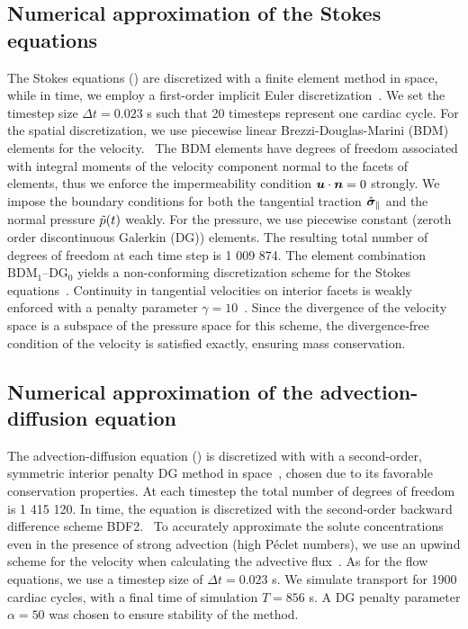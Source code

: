 \documentclass{WileyMSP-template}
\begin{document}
\subsection{Numerical approximation of the Stokes equations}
The Stokes equations () are discretized with a finite element method
in space, while in time, we employ a first-order implicit Euler discretization~\cite{butcher2016numerical}.
We set the timestep size $\Delta t = 0.023$ s such that 20 timesteps represent one cardiac cycle.
For the spatial discretization, we use piecewise linear Brezzi-Douglas-Marini (BDM)
elements for the velocity.~\cite{Brezzi1985TwoProblems, Nedelec1986AIR3}
The BDM elements have degrees of freedom associated with integral moments of the
velocity component normal to the facets of elements,
thus we enforce the impermeability condition $\bm{u}\cdot\bm{n}=0$ strongly.
We impose the boundary conditions for both the tangential traction $\hat{\bm{\sigma}}_{\parallel}$ and
the normal pressure $\Tilde{p}(t)$ weakly.
For the pressure, we use piecewise constant (zeroth order discontinuous Galerkin (DG)) elements.
The resulting total number of degrees of freedom at each time step is 1 009 874.
The element combination $\mathrm{BDM}_1$--$\mathrm{DG}_{0}$ yields a non-conforming
discretization scheme for the Stokes equations~\cite{Stenberg1989SomeEquations}.
Continuity in tangential velocities on interior facets
is weakly enforced with a penalty parameter $\gamma=10$~\cite{Hong2016AEquations}.
Since the divergence of the velocity space is a subspace of the pressure space for this scheme,
the divergence-free condition of the velocity is satisfied exactly, ensuring mass conservation.~\cite{Boffi2008FiniteProblem} 

\subsection{Numerical approximation of the advection-diffusion equation}\label{subsec:num_approx_adv_diff}
The advection-diffusion equation () is discretized
with with a second-order, symmetric interior penalty DG
method in space~\cite{Arnold1982AnElements}, chosen due to its favorable
conservation properties. At each timestep the total number of degrees of freedom 
is 1 415 120. In time, the equation is discretized with the second-order backward
difference scheme BDF2.~\cite{Volker2016}
To accurately approximate the solute concentrations even
in the presence of strong advection (high Péclet numbers),
we use an upwind scheme for the velocity when calculating the
advective flux~\cite{Patankar2018NumericalFlow}.
As for the flow equations, we use a timestep size of
$\Delta t = 0.023$ s. We simulate transport for 1900 cardiac cycles,
with a final time of simulation $T = 856$ s.
A DG penalty parameter $\alpha = 50$ was chosen to ensure stability of the method. 
\end{document}
